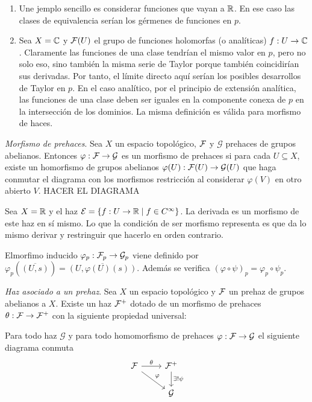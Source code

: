 \documentclass[GA.tex]{subfiles}
\begin{document}
\begin{ejs}
\begin{enumerate}
\item Une jemplo sencillo es considerar funciones que vayan a $\mathbb{R}$. En ese caso las clases de equivalencia serían los gérmenes de funciones en $p$. 

\item Sea $X=\mathbb{C}$ y $\mathcal{F}(U)$ el grupo de funciones holomorfas (o analíticas) $f:U\to\mathbb{C}$. Claramente las funciones de una clase tendrían el mismo valor en $p$, pero no solo eso, sino también la misma serie de Taylor porque también coincidirían sus derivadas. Por tanto, el límite directo aquí serían los posibles desarrollos de Taylor en $p$. En el caso analítico, por el principio de extensión analítica, las funciones de una clase deben ser iguales en la componente conexa de $p$ en la intersección de los dominios. La misma definición es válida para morfismo de haces. 
\end{enumerate}
\end{ejs}


\begin{defi}
\emph{Morfismo de prehaces}. Sea $X$ un espacio topológico, $\mathcal{F}$ y $\mathcal{G}$ prehaces de grupos abelianos. Entonces $\varphi:\mathcal{F}\to\mathcal{G}$ es un morfismo de prehaces si para cada $U\subseteq X$, existe un homorfismo de grupos abelianos $\varphi(U):\mathcal{F}(U)\to\mathcal{G}(U)$ que haga conmutar el diagrama con los morfismos restricción al considerar $\varphi(V)$ en otro abierto $V$.
HACER EL DIAGRAMA
\end{defi}

\begin{ej}
Sea $X=\mathbb{R}$ y el haz $\mathcal{E}=\{f:U\to \mathbb{R}\mid f\in C^{\infty}\}$. La derivada es un morfismo de este haz en sí mismo. Lo que la condición de ser morfismo representa es que da lo mismo derivar y restringuir que hacerlo en orden contrario.
\end{ej}


\begin{prop}

\end{prop}

Elmorfimo inducido $\varphi_p:\mathcal{F}_p\to \mathcal{G}_p$ viene definido por $\varphi_p(\overline{(U,s)})=\overline{(U, \varphi(U)(s))}$. Además se verifica $(\varphi\circ\psi)_p=\varphi_p\circ \psi_p$. 


\begin{defi}[Proposición]
\emph{Haz asociado a un prehaz}. Sea $X$ un espacio topológico y $\mathcal{F}$ un prehaz de grupos abelianos a $X$. Existe un haz $\mathcal{F}^+$ dotado de un morfismo de prehaces $\theta:\mathcal{F}\to\mathcal{F}^+$ con la siguiente propiedad universal:

Para todo haz $\mathcal{G}$ y para todo homomorfismo de prehaces $\varphi:\mathcal{F}\to\mathcal{G}$ el siguiente diagrama conmuta
\[
\begin{tikzcd}
\calF\arrow[r,"\theta"] \arrow[dr, "\varphi"]& \calF^+\arrow[d, "\exists!\psi"]\\
& \mathcal{G}
\end{tikzcd}
\]

\end{defi}
\end{document}

